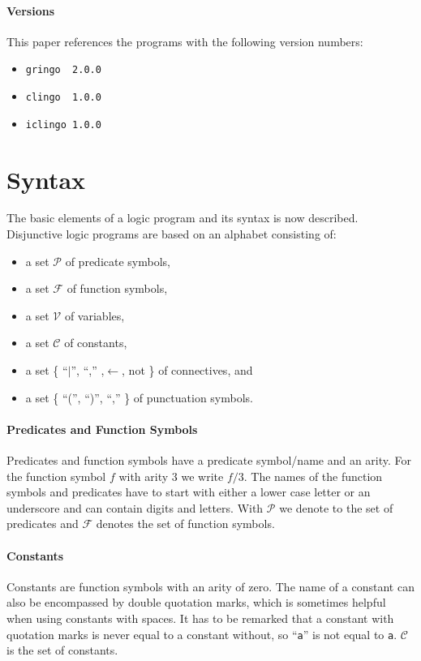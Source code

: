 \documentclass[a4paper,10pt]{article}
\begin{document}
\paragraph{Versions}
This paper references the programs with the following version numbers:
\begin{itemize}
 \item \texttt{gringo\ \ 2.0.0}
 \item \texttt{clingo\ \ 1.0.0}
 \item \texttt{iclingo\ 1.0.0}
\end{itemize}



\section{Syntax}
The basic elements of a logic program and its syntax is now described.
Disjunctive logic programs are based on an alphabet \cite{syntax} consisting of:
\begin{itemize}
\item a set $\mathcal{P}$ of predicate symbols,
\item a set $\mathcal{F}$ of function symbols,
\item a set $\mathcal{V}$ of variables,
\item a set $\mathcal{C}$ of constants,
\item a set \{ ``$\mid$'', ``,'' ,$\leftarrow$, not \} of connectives, and
\item a set \{ ``('', ``)'', ``,'' \} of punctuation symbols.
\end{itemize}

\paragraph{Predicates and Function Symbols}
Predicates and function symbols have a predicate symbol/name and an arity.
For the function symbol $f$ with arity 3 we write $f/3$.
The names of the function symbols and predicates have to start with either a lower case letter or an underscore and can contain digits and letters.
With $\mathcal{P}$ we denote to the set of predicates and $\mathcal{F}$ denotes the set of function symbols.
\paragraph{Constants}
Constants are function symbols with an arity of zero.
The name of a constant can also be encompassed by double quotation marks, which is sometimes helpful when using constants with spaces. It has to be remarked that a constant with quotation marks is never equal to a constant without, so ``\texttt{a}'' is not equal to \texttt{a}.
$\mathcal{C}$ is the set of constants.
\end{document}

